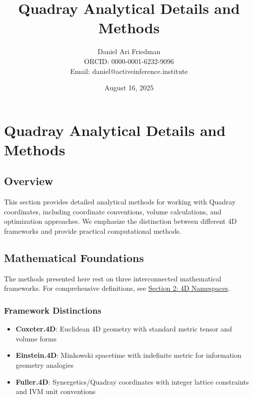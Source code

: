 \documentclass[
  10pt,
]{article}
\title{Quadray Analytical Details and Methods}
\author{Daniel Ari Friedman\\ ORCID: 0000-0001-6232-9096\\ Email: daniel@activeinference.institute}
\date{August 16, 2025}
\providecommand{\tightlist}{%
  \setlength{\itemsep}{0pt}\setlength{\parskip}{0pt}}
\begin{document}
\maketitle

{
\hypersetup{linkcolor=black}
\setcounter{tocdepth}{3}
\tableofcontents
}
\hypertarget{quadray-analytical-details-and-methods}{%
\section{Quadray Analytical Details and
Methods}\label{quadray-analytical-details-and-methods}}

\hypertarget{overview}{%
\subsection{Overview}\label{overview}}

This section provides detailed analytical methods for working with
Quadray coordinates, including coordinate conventions, volume
calculations, and optimization approaches. We emphasize the distinction
between different 4D frameworks and provide practical computational
methods.

\hypertarget{mathematical-foundations}{%
\subsection{Mathematical Foundations}\label{mathematical-foundations}}

The methods presented here rest on three interconnected mathematical
frameworks. For comprehensive definitions, see
\href{02_4d_namespaces.md}{Section 2: 4D Namespaces}.

\hypertarget{framework-distinctions}{%
\subsubsection{Framework Distinctions}\label{framework-distinctions}}

\begin{itemize}
\tightlist
\item
  \textbf{Coxeter.4D}: Euclidean 4D geometry with standard metric tensor
  and volume forms
\item
  \textbf{Einstein.4D}: Minkowski spacetime with indefinite metric for
  information geometry analogies\\
\item
  \textbf{Fuller.4D}: Synergetics/Quadray coordinates with integer
  lattice constraints and IVM unit conventions
\end{itemize}
\end{document}
